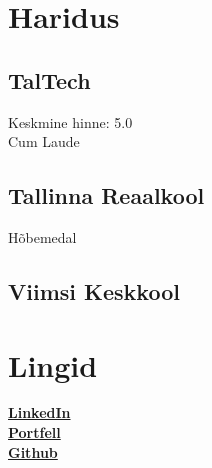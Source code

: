 \documentclass[letterpaper]{deedy-resume} %
\begin{document}
\begin{minipage}[t]{0.33\textwidth} %


\section{Haridus}

\subsection{TalTech}

Keskmine hinne: 5.0 \\
Cum Laude


\sectionspace %

\subsection{Tallinna Reaalkool}

Hõbemedal

\sectionspace %

\subsection{Viimsi Keskkool}

\sectionspace %


\section{Lingid}

\href{https://www.linkedin.com/in/evo-annus-094362231/}{\bf LinkedIn} \\
\href{https://susiik.github.io/}{\bf Portfell} \\
\href{https://github.com/susIik}{\bf Github} \\

\sectionspace %


\end{minipage}
\end{document}
